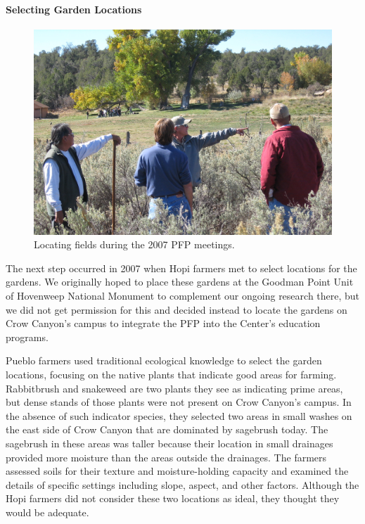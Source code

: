 \documentclass[12pt,]{article}
\let\oldparagraph\paragraph
\renewcommand{\paragraph}[1]{\oldparagraph{#1}\mbox{}}
\begin{document}
\hypertarget{selecting-garden-locations}{%
\paragraph{Selecting Garden Locations}\label{selecting-garden-locations}}

\begin{figure}
\centering
\includegraphics{./images/2007_locating_fields.jpg}
\caption{Locating fields during the 2007 PFP meetings.}
\end{figure}

The next step occurred in 2007 when Hopi farmers met to select locations for the gardens. We originally hoped to place these gardens at the Goodman Point Unit of Hovenweep National Monument to complement our ongoing research there, but we did not get permission for this and decided instead to locate the gardens on Crow Canyon's campus to integrate the PFP into the Center's education programs.

Pueblo farmers used traditional ecological knowledge to select the garden locations, focusing on the native plants that indicate good areas for farming. Rabbitbrush and snakeweed are two plants they see as indicating prime areas, but dense stands of those plants were not present on Crow Canyon's campus. In the absence of such indicator species, they selected two areas in small washes on the east side of Crow Canyon that are dominated by sagebrush today. The sagebrush in these areas was taller because their location in small drainages provided more moisture than the areas outside the drainages. The farmers assessed soils for their texture and moisture-holding capacity and examined the details of specific settings including slope, aspect, and other factors. Although the Hopi farmers did not consider these two locations as ideal, they thought they would be adequate.
\end{document}
